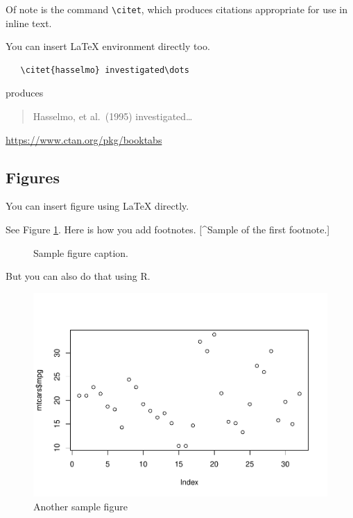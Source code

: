 \documentclass{article}
\newenvironment{Shaded}{\begin{snugshade}}{\end{snugshade}}
\newcommand{\FunctionTok}[1]{\textcolor[rgb]{0.00,0.00,0.00}{#1}}
\newcommand{\NormalTok}[1]{#1}
\newcommand{\SpecialCharTok}[1]{\textcolor[rgb]{0.00,0.00,0.00}{#1}}
\begin{document}
Of note is the command \verb+\citet+, which produces citations
appropriate for use in inline text.

You can insert LaTeX environment directly too.

\begin{verbatim}
   \citet{hasselmo} investigated\dots
\end{verbatim}

produces

\begin{quote}
  Hasselmo, et al.\ (1995) investigated\dots
\end{quote}

\begin{center}
  \url{https://www.ctan.org/pkg/booktabs}
\end{center}

\hypertarget{figures}{%
\subsection{Figures}\label{figures}}

You can insert figure using LaTeX directly.

See Figure \ref{fig:fig1}. Here is how you add footnotes. {[}\^{}Sample
of the first footnote.{]}

\begin{figure}
  \centering
  \fbox{\rule[-.5cm]{4cm}{4cm} \rule[-.5cm]{4cm}{0cm}}
  \caption{Sample figure caption.}
  \label{fig:fig1}
\end{figure}

But you can also do that using R.

\begin{Shaded}
\end{Shaded}

\begin{figure}
\centering
\includegraphics{210431461_CSC8639_Dissertation_files/figure-latex/fig2-1.pdf}
\caption{Another sample figure}
\end{figure}
\end{document}
